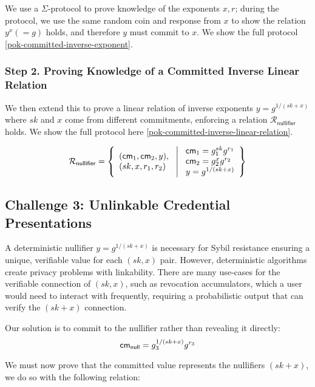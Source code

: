 We use a $\Sigma$-protocol to prove knowledge of the exponents $x, r$; during the protocol, we use the same random coin and response from $x$ to show the relation $y^x (=g)$ holds, and therefore $y$ must commit to $x$. We show the full protocol \ref{pok-committed-inverse-exponent}. 

\subsubsection*{Step 2. Proving Knowledge of a Committed Inverse Linear Relation}

We then extend this to prove a linear relation of inverse exponents $y = g^{1/(sk+x)}$ where $sk$ and $x$ come from different commitments, enforcing a relation $\mathcal{R}_{\mathsf{nullifier}}$ holds. We show the full protocol here \ref{pok-committed-inverse-linear-relation}. 

\[
\mathcal{R}_{\mathsf{nullifier}} = \left\{ 
\begin{array}{l} (\mathsf{cm}_1, \mathsf{cm}_2, y),\\
(sk, x, r_1, r_2) 
\end{array}
\ \middle|
\ \begin{array}{l}
\mathsf{cm}_1 = g_1^{sk} g^{r_1} \\
\mathsf{cm}_2 = g_2^{x} g^{r_2} \\
y = g^{1/(sk + x)} \\
\end{array} \right\}
\]


\subsection{Challenge 3: Unlinkable Credential Presentations}

A deterministic nullifier $y = g^{1/(sk+x)}$ is necessary for Sybil resistance ensuring a unique, verifiable value for each $(sk,x)$ pair. However, deterministic algorithms create privacy problems with linkability. There are many use-cases for the verifiable connection of $(sk, x)$, such as revocation accumulators, which a user would need to interact with frequently, requiring a probabilistic output that can verify the $(sk+x)$ connection. 

Our solution is to commit to the nullifier rather than revealing it directly:
\[
\mathsf{cm}_{\mathsf{null}} = g_3^{1/(sk+x)} g^{r_3}
\]

We must now prove that the committed value represents the nullifiers $(sk+x)$, we do so with the following relation:



